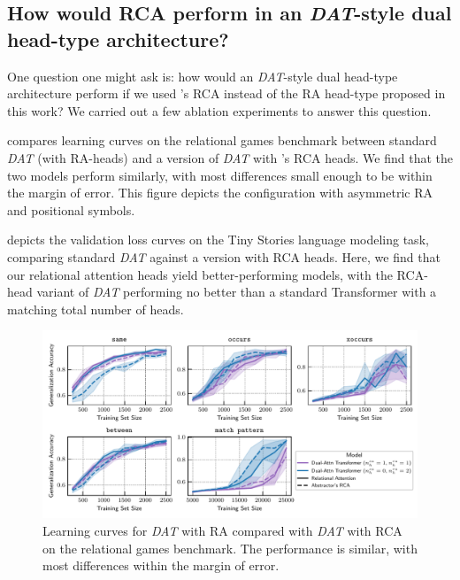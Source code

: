 \subsection{How would RCA perform in an \textit{DAT}-style dual head-type architecture?}

One question one might ask is: how would an \textit{DAT}-style dual head-type architecture perform if we used \citet{altabaa2024abstractors}'s RCA instead of the RA head-type proposed in this work? We carried out a few ablation experiments to answer this question.

 compares learning curves on the relational games benchmark between standard \textit{DAT} (with RA-heads) and a version of \textit{DAT} with \citet{altabaa2024abstractors}'s RCA heads. We find that the two models perform similarly, with most differences small enough to be within the margin of error. This figure depicts the configuration with asymmetric RA and positional symbols.

 depicts the validation loss curves on the Tiny Stories language modeling task, comparing standard \textit{DAT} against a version with RCA heads. Here, we find that our relational attention heads yield better-performing models, with the RCA-head variant of \textit{DAT} performing no better than a standard Transformer with a matching total number of heads.

\begin{figure}[ht]
    \includegraphics[width=\textwidth]{figs/experiments/relgames/relgames_learning_curves_rcatype_ablation.pdf}
    \caption{Learning curves for \textit{DAT} with RA compared with \textit{DAT} with RCA on the relational games benchmark. The performance is similar, with most differences within the margin of error.}\label{fig:relgames_ratype_ablation}
\end{figure}

